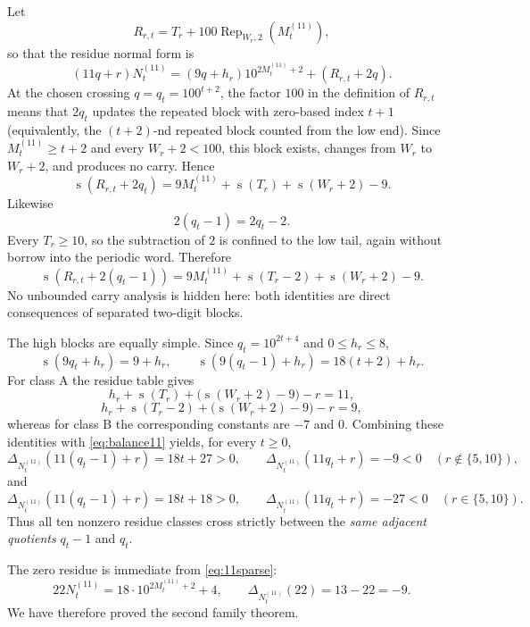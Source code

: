 \documentclass[11pt]{article}
\newcommand{\ds}{\operatorname{s}}
\newcommand{\Def}{\Delta}
\begin{document}
Let
\[
 R_{r,t}=T_r+100\operatorname{Rep}_{W_r,2}(M^{(11)}_t),
\]
so that the residue normal form is
\begin{equation}\label{eq:11split}
 (11q+r)N^{(11)}_t
 =(9q+h_r)10^{2M^{(11)}_t+2}+(R_{r,t}+2q).
\end{equation}
At the chosen crossing $q=q_t=100^{t+2}$, the factor $100$ in the definition of $R_{r,t}$ means that $2q_t$ updates the repeated block with zero-based index $t+1$ (equivalently, the $(t+2)$-nd repeated block counted from the low end).  Since $M^{(11)}_t\ge t+2$ and every $W_r+2<100$, this block exists, changes from $W_r$ to $W_r+2$, and produces no carry.  Hence
\begin{equation}\label{eq:11lowright}
 \ds(R_{r,t}+2q_t)
 =9M^{(11)}_t+\ds(T_r)+\ds(W_r+2)-9.
\end{equation}
Likewise
\[
 2(q_t-1)=2q_t-2.
\]
Every $T_r\ge10$, so the subtraction of $2$ is confined to the low tail, again without borrow into the periodic word.  Therefore
\begin{equation}\label{eq:11lowleft}
 \ds(R_{r,t}+2(q_t-1))
 =9M^{(11)}_t+\ds(T_r-2)+\ds(W_r+2)-9.
\end{equation}
No unbounded carry analysis is hidden here: both identities are direct consequences of separated two-digit blocks.

The high blocks are equally simple.  Since $q_t=10^{2t+4}$ and $0\le h_r\le8$,
\begin{equation}\label{eq:11high}
 \ds(9q_t+h_r)=9+h_r,
 \qquad
 \ds(9(q_t-1)+h_r)=18(t+2)+h_r.
\end{equation}
For class A the residue table gives
\[
 h_r+\ds(T_r)+\bigl(\ds(W_r+2)-9\bigr)-r=11,
\]
\[
 h_r+\ds(T_r-2)+\bigl(\ds(W_r+2)-9\bigr)-r=9,
\]
whereas for class B the corresponding constants are $-7$ and $0$.  Combining these identities with \eqref{eq:balance11} yields, for every $t\ge0$,
\begin{equation}\label{eq:11familycrossA}
 \Def_{N^{(11)}_t}(11(q_t-1)+r)=18t+27>0,
 \qquad
 \Def_{N^{(11)}_t}(11q_t+r)=-9<0
 \quad(r\notin\{5,10\}),
\end{equation}
and
\begin{equation}\label{eq:11familycrossB}
 \Def_{N^{(11)}_t}(11(q_t-1)+r)=18t+18>0,
 \qquad
 \Def_{N^{(11)}_t}(11q_t+r)=-27<0
 \quad(r\in\{5,10\}).
\end{equation}
Thus all ten nonzero residue classes cross strictly between the \emph{same adjacent quotients} $q_t-1$ and $q_t$.

The zero residue is immediate from \eqref{eq:11sparse}:
\[
 22N^{(11)}_t=18\cdot10^{2M^{(11)}_t+2}+4,
 \qquad
 \Def_{N^{(11)}_t}(22)=13-22=-9.
\]
We have therefore proved the second family theorem.
\end{document}

